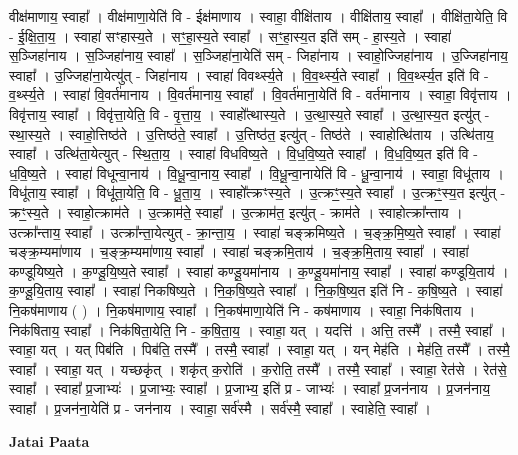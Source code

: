 \documentclass[17pt]{extarticle}
\begin{document}
वीक्ष॑माणाय॒ स्वाहा᳚ । वीक्ष॑माणा॒येति॑ वि - ईक्ष॑माणाय । स्वाहा॒ वीक्षि॑ताय । वीक्षि॑ताय॒ स्वाहा᳚ । वीक्षि॑ता॒येति॒ वि - ई॒क्षि॒ता॒य॒ । स्वाहा॑ सꣳहास्य॒ते । सꣳ॒॒हा॒स्य॒ते स्वाहा᳚ । सꣳ॒॒हा॒स्य॒त इति॑ सम् - हा॒स्य॒ते । स्वाहा॑ स॒ञ्जिहा॑नाय । स॒ञ्जिहा॑नाय॒ स्वाहा᳚ । स॒ञ्जिहा॑ना॒येति॑ सम् - जिहा॑नाय । स्वाहो॒ज्जिहा॑नाय । उ॒ज्जिहा॑नाय॒ स्वाहा᳚ । उ॒ज्जिहा॑ना॒येत्यु॑त् - जिहा॑नाय । स्वाहा॑ विवर्थ्स्य॒ते । वि॒व॒र्थ्स्य॒ते स्वाहा᳚ । वि॒व॒र्थ्स्य॒त इति॑ वि - व॒र्थ्स्य॒ते । स्वाहा॑ वि॒वर्त॑मानाय । वि॒वर्त॑मानाय॒ स्वाहा᳚ । वि॒वर्त॑माना॒येति॑ वि - वर्त॑मानाय । स्वाहा॒ विवृ॑त्ताय । विवृ॑त्ताय॒ स्वाहा᳚ । विवृ॑त्ता॒येति॒ वि - वृ॒त्ता॒य॒ । स्वाहो᳚त्थास्य॒ते । उ॒त्था॒स्य॒ते स्वाहा᳚ । उ॒त्था॒स्य॒त इत्यु॑त् - स्था॒स्य॒ते । स्वाहो॒त्तिष्ठ॑ते । उ॒त्तिष्ठ॑ते॒ स्वाहा᳚ । उ॒त्तिष्ठ॑त॒ इत्यु॑त् - तिष्ठ॑ते । स्वाहोत्थि॑ताय । उत्थि॑ताय॒ स्वाहा᳚ । उत्थि॑ता॒येत्युत् - स्थि॒ता॒य॒ । स्वाहा॑ विधविष्य॒ते । वि॒ध॒वि॒ष्य॒ते स्वाहा᳚ । वि॒ध॒वि॒ष्य॒त इति॑ वि - ध॒वि॒ष्य॒ते । स्वाहा॑ विधून्वा॒नाय॑ । वि॒धू॒न्वा॒नाय॒ स्वाहा᳚ । वि॒धू॒न्वा॒नायेति॑ वि - धू॒न्वा॒नाय॑ । स्वाहा॒ विधू॑ताय । विधू॑ताय॒ स्वाहा᳚ । विधू॑ता॒येति॒ वि - धू॒ता॒य॒ । स्वाहो᳚त्क्रꣳस्य॒ते । उ॒त्क्रꣳ॒॒स्य॒ते स्वाहा᳚ । उ॒त्क्रꣳ॒॒स्य॒त इत्यु॑त् - क्रꣳ॒॒स्य॒ते । स्वाहो॒त्क्राम॑ते । उ॒त्क्राम॑ते॒ स्वाहा᳚ । उ॒त्क्राम॑त॒ इत्यु॑त् - क्राम॑ते । स्वाहोत्क्रा᳚न्ताय । उत्क्रा᳚न्ताय॒ स्वाहा᳚ । उत्क्रा᳚न्ता॒येत्युत् - क्रा॒न्ता॒य॒ । स्वाहा॑ चङ्‍क्रमिष्य॒ते । च॒ङ्‍क्र॒मि॒ष्य॒ते स्वाहा᳚ । स्वाहा॑ चङ्‍क्र॒म्यमा॑णाय । च॒ङ्‍क्र॒म्यमा॑णाय॒ स्वाहा᳚ । स्वाहा॑ चङ्‍क्रमि॒ताय॑ । च॒ङ्‍क्र॒मि॒ताय॒ स्वाहा᳚ । स्वाहा॑ कण्डूयिष्य॒ते । क॒ण्डू॒यि॒ष्य॒ते स्वाहा᳚ । स्वाहा॑ कण्डू॒यमा॑नाय । क॒ण्डू॒यमा॑नाय॒ स्वाहा᳚ । स्वाहा॑ कण्डूयि॒ताय॑ । क॒ण्डू॒यि॒ताय॒ स्वाहा᳚ । स्वाहा॑ निकषिष्य॒ते । नि॒क॒षि॒ष्य॒ते स्वाहा᳚ । नि॒क॒षि॒ष्य॒त इति॑ नि - क॒षि॒ष्य॒ते । स्वाहा॑ नि॒कष॑माणाय ( ) । नि॒कष॑माणाय॒ स्वाहा᳚ । नि॒कष॑माणा॒येति॑ नि - कष॑माणाय । स्वाहा॒ निक॑षिताय । निक॑षिताय॒ स्वाहा᳚ । निक॑षिता॒येति॒ नि - क॒षि॒ता॒य॒ । स्वाहा॒ यत् । यदत्ति॑ । अत्ति॒ तस्मै᳚ । तस्मै॒ स्वाहा᳚ । स्वाहा॒ यत् । यत् पिब॑ति । पिब॑ति॒ तस्मै᳚ । तस्मै॒ स्वाहा᳚ । स्वाहा॒ यत् । यन् मेह॑ति । मेह॑ति॒ तस्मै᳚ । तस्मै॒ स्वाहा᳚ । स्वाहा॒ यत् । यच्छकृ॑त् । शकृ॑त् क॒रोति॑ । क॒रोति॒ तस्मै᳚ । तस्मै॒ स्वाहा᳚ । स्वाहा॒ रेत॑से । रेत॑से॒ स्वाहा᳚ । स्वाहा᳚ प्र॒जाभ्यः॑ । प्र॒जाभ्यः॒ स्वाहा᳚ । प्र॒जाभ्य॒ इति॑ प्र - जाभ्यः॑ । स्वाहा᳚ प्र॒जन॑नाय । प्र॒जन॑नाय॒ स्वाहा᳚ । 
प्र॒जन॑ना॒येति॑ प्र - जन॑नाय । स्वाहा॒ सर्व॑स्मै । सर्व॑स्मै॒ स्वाहा᳚ । स्वाहेति॒ स्वाहा᳚ । \newline

\textbf{Jatai Paata} \newline
\end{document}
